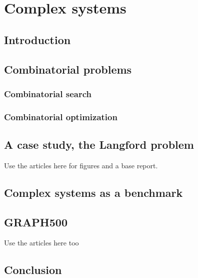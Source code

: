 \chapter{Complex systems}

\section{Introduction}

\section{Combinatorial problems}

\subsection{Combinatorial search}

\subsection{Combinatorial optimization}

\section{A case study, the Langford problem}

Use the articles here for figures and a base report. 
 
\section{Complex systems as a benchmark} 

\section{GRAPH500}

Use the articles here too 
 
\section{Conclusion}
